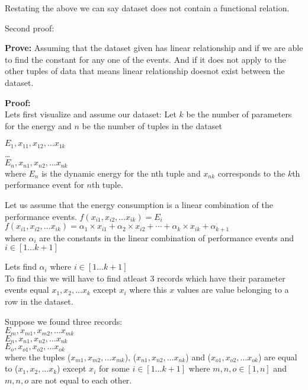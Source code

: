 Restating the above we can say dataset does not contain a functional relation.

\newpage

Second proof:

\textbf{Prove:} Assuming that the dataset given has linear relationship and if we are able to find the constant for any one of the events. And if it does not apply to the other tuples of data that means linear relationship doesnot exist between the dataset.

\textbf{Proof:}\\Lets first visualize and assume our dataset:
Let \(k\) be the number of parameters for the energy and \(n\) be the number of tuples in the dataset

\(E_1,x_{11}, x_{12}, \ldots x_{1k}\)\\
\ldots\\
\(E_n,x_{n1}, x_{n2}, \ldots x_{nk}\)\\
where \(E_n\) is the dynamic energy for the nth tuple and \(x_{nk}\) corresponds to the \(k\)th performance event for \(n\)th tuple.

Let us assume that the energy consumption is a linear combination of the performance events.
\(f(x_{i1}, x_{i2}, \ldots x_{ik}) = E_i\)\\
\(f(x_{i1}, x_{i2}, \ldots x_{ik}) = \alpha _1\times x_{i1} + \alpha_2\times x_{i2} + \cdots + \alpha_k\times x_{ik} + \alpha_{k+1}\)\\
where \(\alpha_i\) are the constants in the linear combination of performance events and \(i\in[1\ldots k+1]\)

Lets find \(\alpha_i\) where \(i\in[1\ldots k+1]\)\\
To find this we will have to find atleast 3 records which have their parameter events equal \(x_{1}, x_{2}, \ldots x_{k}\) except \(x_{i}\) where this \(x\) values are value belonging to a row in the dataset.

Suppose we found three records:\\
\(E_m,x_{m1}, x_{m2}, \ldots x_{mk}\)\\
\(E_n,x_{n1}, x_{n2}, \ldots x_{nk}\)\\
\(E_o,x_{o1}, x_{o2}, \ldots x_{ok}\)\\
where the tuples (\(x_{m1}, x_{m2}, \ldots x_{mk}\)), (\(x_{n1}, x_{n2}, \ldots x_{nk}\)) and (\(x_{o1}, x_{o2}, \ldots x_{ok}\)) are equal to (\(x_{1}, x_{2}, \ldots x_{k}\)) except \(x_{i}\) for some \(i\in[1\ldots k+1]\) where \(m, n, o \in [1, n]\) and \(m, n, o\) are not equal to each other.

